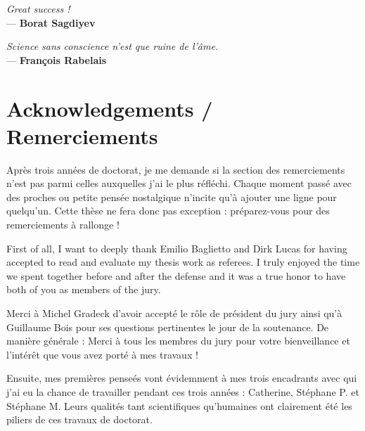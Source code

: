 

\begin{flushleft}{\slshape    
Great success !} \\ \medskip
--- \textbf{Borat Sagdiyev}
\end{flushleft}
\begin{flushright}{\slshape    
Science sans conscience n'est que ruine de l'âme.} \\ \medskip
--- \textbf{Fran\c{c}ois Rabelais}
\end{flushright}

\npar




\bigskip


\begingroup

\let\clearpage\relax
\let\cleardoublepage\relax
\let\cleardoublepage\relax

\chapter*{Acknowledgements / Remerciements}

Après trois années de doctorat, je me demande si la section des remerciements n'est pas parmi celles auxquelles j'ai le plus réfléchi. Chaque moment passé avec des proches ou petite pensée nostalgique n'incite qu'à ajouter une ligne pour quelqu'un. Cette thèse ne fera donc pas exception : préparez-vous pour des remerciements à rallonge ! 


\npar

First of all, I want to deeply thank Emilio Baglietto and Dirk Lucas for having accepted to read and evaluate my thesis work as referees. I truly enjoyed the time we spent together before and after the defense and it was a true honor to have both of you as members of the jury. 

Merci à Michel Gradeck d'avoir accepté le rôle de président du jury ainsi qu'à Guillaume Bois pour ses questions pertinentes le jour de la soutenance. De manière générale : Merci à tous les membres du jury pour votre bienveillance et l'intérêt que vous avez porté à mes travaux !

\npar

Ensuite, mes premières penseés vont évidemment à mes trois encadrants avec qui j'ai eu la chance de travailler pendant ces trois années : Catherine, Stéphane P. et Stéphane M. Leurs qualités tant scientifiques qu'humaines ont clairement été les piliers de ces travaux de doctorat.

